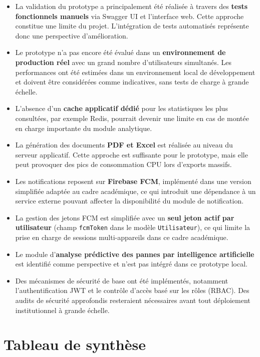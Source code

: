 \begin{itemize}
    \item La validation du prototype a principalement été réalisée à travers des \textbf{tests fonctionnels manuels} via Swagger UI et l'interface web. Cette approche constitue une limite du projet. L’intégration de tests automatisés représente donc une perspective d’amélioration.
    \item Le prototype n'a pas encore été évalué dans un \textbf{environnement de production réel} avec un grand nombre d'utilisateurs simultanés. Les performances ont été estimées dans un environnement local de développement et doivent être considérées comme indicatives, sans tests de charge à grande échelle.
    \item L'absence d'un \textbf{cache applicatif dédié} pour les statistiques les plus consultées, par exemple Redis, pourrait devenir une limite en cas de montée en charge importante du module analytique.
    \item La génération des documents \textbf{PDF et Excel} est réalisée au niveau du serveur applicatif. Cette approche est suffisante pour le prototype, mais elle peut provoquer des pics de consommation CPU lors d'exports massifs.
    \item Les notifications reposent sur \textbf{Firebase FCM}, implémenté dans une version simplifiée adaptée au cadre académique, ce qui introduit une dépendance à un service externe pouvant affecter la disponibilité du module de notification.
    \item La gestion des jetons FCM est simplifiée avec un \textbf{seul jeton actif par utilisateur} (champ \texttt{fcmToken} dans le modèle \texttt{Utilisateur}), ce qui limite la prise en charge de sessions multi-appareils dans ce cadre académique.
    \item Le module d'\textbf{analyse prédictive des pannes par intelligence artificielle} est identifié comme perspective et n'est pas intégré dans ce prototype local.
    \item Des mécanismes de sécurité de base ont été implémentés, notamment l’authentification JWT et le contrôle d’accès basé sur les rôles (RBAC). Des audits de sécurité approfondis resteraient nécessaires avant tout déploiement institutionnel à grande échelle.
\end{itemize}

\section*{Tableau de synthèse}
\label{sec:synthese_finale}

